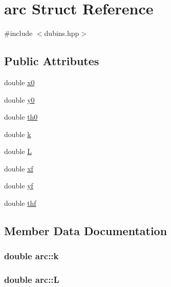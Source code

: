 \hypertarget{structarc}{}\section{arc Struct Reference}
\label{structarc}


{\ttfamily \#include $<$dubins.\+hpp$>$}

\subsection*{Public Attributes}
\begin{DoxyCompactItemize}
\item 
double \hyperlink{structarc_ad60b4e1112097080fa11407721c0861f}{x0}
\item 
double \hyperlink{structarc_a08238ea80ade516e2ebfdb26a2606f5b}{y0}
\item 
double \hyperlink{structarc_ab765aaeb5808e77eb46c5945d46721b2}{th0}
\item 
double \hyperlink{structarc_a84edb625d7d7f0d129cafd9d5be54372}{k}
\item 
double \hyperlink{structarc_ad8362a6ce618675cf90feab5ca6ae06e}{L}
\item 
double \hyperlink{structarc_a251bf33e415a35d8741614d269533438}{xf}
\item 
double \hyperlink{structarc_aec9559e816f88bceac0fca3f2728d96f}{yf}
\item 
double \hyperlink{structarc_a83c106a3b39bb17ca66e7d5cf5f5faf0}{thf}
\end{DoxyCompactItemize}


\subsection{Member Data Documentation}
\subsubsection[{\texorpdfstring{k}{k}}]{\setlength{\rightskip}{0pt plus 5cm}double arc\+::k}\hypertarget{structarc_a84edb625d7d7f0d129cafd9d5be54372}{}\label{structarc_a84edb625d7d7f0d129cafd9d5be54372}
\subsubsection[{\texorpdfstring{L}{L}}]{\setlength{\rightskip}{0pt plus 5cm}double arc\+::L}\hypertarget{structarc_ad8362a6ce618675cf90feab5ca6ae06e}{}\label{structarc_ad8362a6ce618675cf90feab5ca6ae06e}
